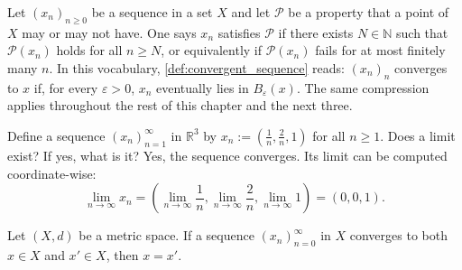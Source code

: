 \begin{notation}[\qt{Eventually}]
\label{not:eventually}
Let $(x_n)_{n\geq0}$ be a sequence in a set $X$ and let $\mathcal{P}$ be a property that a point
of $X$ may or may not have. One says $x_n$ satisfies $\mathcal{P}$ 
 if there exists $N \in \mathbb{N}$ such that $\mathcal{P}(x_n)$
holds for all $n \geq N$, or equivalently if $\mathcal{P}(x_n)$ fails for at most finitely many
$n$. In this vocabulary, \cref{def:convergent_sequence} reads: $(x_n)_n$ converges to $x$ if, for
every $\varepsilon>0$, $x_n$ eventually lies in $B_\varepsilon(x)$. The same compression applies
throughout the rest of this chapter and the next three.
\end{notation}

\begin{example}
\label{ex:convergent_sequence_R3}
Define a sequence $(x_n)_{n=1}^{\infty}$ in $\mathbb{R}^3$ by $x_n := \left(\frac{1}{n}, \frac{2}{n}, 1\right)$ for all $n \geq 1$. Does a limit exist? If yes, what is it?
Yes, the sequence converges. Its limit can be computed coordinate-wise:
\[
\lim_{n\to\infty} x_n = \left(\lim_{n\to\infty} \frac{1}{n}, \lim_{n\to\infty} \frac{2}{n}, \lim_{n\to\infty} 1\right) = (0,0,1).
\]
\end{example}

\begin{proposition}
\label{prop:uniqueness_of_limits}
Let $(X,d)$ be a metric space. If a sequence $(x_n)_{n=0}^{\infty}$ in $X$ converges to both
$x \in X$ and $x' \in X$, then $x = x'$.
\end{proposition}

